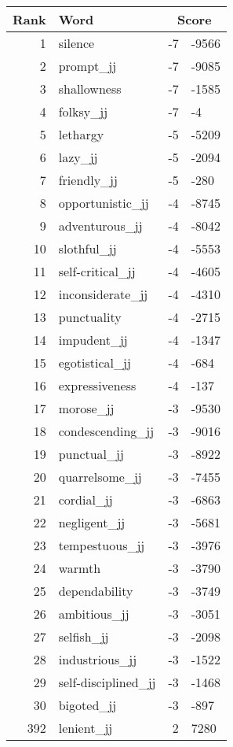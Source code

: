 \begin{longtable}[!htbp]{| rlr@{.}l |}
    \hline
    \textbf{Rank} & \textbf{Word} & \multicolumn{2}{c|}{\textbf{Score}} \\
    \hline
    \endhead
    1 & silence & -7 & -9566 \\
    2 & prompt\_jj & -7 & -9085 \\
    3 & shallowness & -7 & -1585 \\
    4 & folksy\_jj & -7 & -4 \\
    5 & lethargy & -5 & -5209 \\
    6 & lazy\_jj & -5 & -2094 \\
    7 & friendly\_jj & -5 & -280 \\
    8 & opportunistic\_jj & -4 & -8745 \\
    9 & adventurous\_jj & -4 & -8042 \\
    10 & slothful\_jj & -4 & -5553 \\
    11 & self-critical\_jj & -4 & -4605 \\
    12 & inconsiderate\_jj & -4 & -4310 \\
    13 & punctuality & -4 & -2715 \\
    14 & impudent\_jj & -4 & -1347 \\
    15 & egotistical\_jj & -4 & -684 \\
    16 & expressiveness & -4 & -137 \\
    17 & morose\_jj & -3 & -9530 \\
    18 & condescending\_jj & -3 & -9016 \\
    19 & punctual\_jj & -3 & -8922 \\
    20 & quarrelsome\_jj & -3 & -7455 \\
    21 & cordial\_jj & -3 & -6863 \\
    22 & negligent\_jj & -3 & -5681 \\
    23 & tempestuous\_jj & -3 & -3976 \\
    24 & warmth & -3 & -3790 \\
    25 & dependability & -3 & -3749 \\
    26 & ambitious\_jj & -3 & -3051 \\
    27 & selfish\_jj & -3 & -2098 \\
    28 & industrious\_jj & -3 & -1522 \\
    29 & self-disciplined\_jj & -3 & -1468 \\
    30 & bigoted\_jj & -3 & -897 \\
    392 & lenient\_jj & 2 & 7280 \\

\end{longtable}
